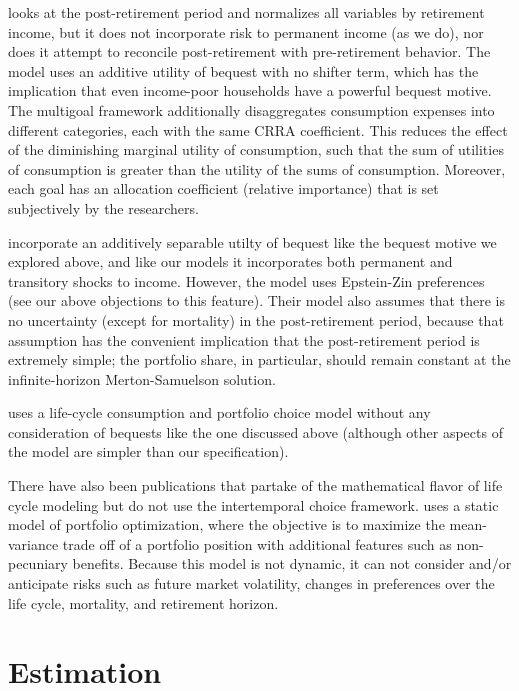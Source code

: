 \documentclass{article}
\begin{document}
\cite{Daga_2023} looks at the post-retirement period and normalizes all variables by retirement income, but it does not incorporate risk to permanent income (as we do), nor does it attempt to reconcile post-retirement with pre-retirement behavior.
The model uses an additive utility of bequest with no shifter term, which has the implication that even income-poor households have a powerful bequest motive.
The multigoal framework additionally disaggregates consumption expenses into different categories, each with the same CRRA coefficient.
This reduces the effect of the diminishing marginal utility of consumption, such that the sum of utilities of consumption is greater than the utility of the sums of consumption.
Moreover, each goal has an allocation coefficient (relative importance) that is set subjectively by the researchers.

\cite{O_Hara_2015} incorporate an additively separable utilty of bequest like the bequest motive we explored above, and like our models it incorporates both permanent and transitory shocks to income.
However, the model uses Epstein-Zin preferences (see our above objections to this feature).
Their model also assumes that there is no uncertainty (except for mortality) in the post-retirement period, because that assumption has the convenient implication that the post-retirement period is extremely simple; the portfolio share, in particular, should remain constant at the infinite-horizon Merton-Samuelson solution.

\cite{Lanski_2022} uses a life-cycle consumption and portfolio choice model without any consideration of bequests like the one discussed above (although other aspects of the model are simpler than our specification).

There have also been publications that partake of the mathematical flavor of life cycle modeling but do not use the intertemporal choice framework.
\cite{Idzorek_2023} uses a static model of portfolio optimization, where the objective is to maximize the mean-variance trade off of a portfolio position with additional features such as non-pecuniary benefits.
Because this model is not dynamic, it can not consider and/or anticipate risks such as future market volatility, changes in preferences over the life cycle, mortality, and retirement horizon.

\section{Estimation}
\end{document}
